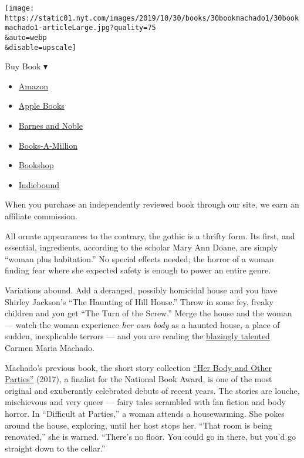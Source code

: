 \texttt{[image: https://static01.nyt.com/images/2019/10/30/books/30bookmachado1/30bookmachado1-articleLarge.jpg?quality=75\\\&auto=webp\\\&disable=upscale]}

Buy Book ▾

\begin{itemize}
\tightlist
\item
  \href{https://www.amazon.com/gp/search?index=books\&tag=NYTBSREV-20\&field-keywords=In+the+Dream+House+Carmen+Maria+Machado}{Amazon}
\item
  \href{https://du-gae-books-dot-nyt-du-prd.appspot.com/buy?title=In+the+Dream+House\&author=Carmen+Maria+Machado}{Apple
  Books}
\item
  \href{https://www.anrdoezrs.net/click-7990613-11819508?url=https\%3A\%2F\%2Fwww.barnesandnoble.com\%2Fw\%2F\%3Fean\%3D9781644450031}{Barnes
  and Noble}
\item
  \href{https://www.anrdoezrs.net/click-7990613-35140?url=https\%3A\%2F\%2Fwww.booksamillion.com\%2Fp\%2FIn\%2Bthe\%2BDream\%2BHouse\%2FCarmen\%2BMaria\%2BMachado\%2F9781644450031}{Books-A-Million}
\item
  \href{https://bookshop.org/a/3546/9781644450031}{Bookshop}
\item
  \href{https://www.indiebound.org/book/9781644450031?aff=NYT}{Indiebound}
\end{itemize}

When you purchase an independently reviewed book through our site, we
earn an affiliate commission.

All ornate appearances to the contrary, the gothic is a thrifty form.
Its first, and essential, ingredients, according to the scholar Mary Ann
Doane, are simply ``woman plus habitation.'' No special effects needed;
the horror of a woman finding fear where she expected safety is enough
to power an entire genre.

Variations abound. Add a deranged, possibly homicidal house and you have
Shirley Jackson's ``The Haunting of Hill House.'' Throw in some fey,
freaky children and you get ``The Turn of the Screw.'' Merge the house
and the woman --- watch the woman experience \emph{her own body} as a
haunted house, a place of sudden, inexplicable terrors --- and you are
reading the
\href{https://www.nytimes.com/2018/03/05/books/vanguard-books-by-women-in-21st-century.html}{blazingly
talented} Carmen Maria Machado.

Machado's previous book, the short story collection
\href{https://www.nytimes.com/2017/10/04/books/review-her-body-and-other-parties-carmen-maria-machado.html}{``Her
Body and Other Parties''} (2017), a finalist for the National Book
Award, is one of the most original and exuberantly celebrated debuts of
recent years. The stories are louche, mischievous and very queer ---
fairy tales scrambled with fan fiction and body horror. In ``Difficult
at Parties,'' a woman attends a housewarming. She pokes around the
house, exploring, until her host stops her. ``That room is being
renovated,'' she is warned. ``There's no floor. You could go in there,
but you'd go straight down to the cellar.''

